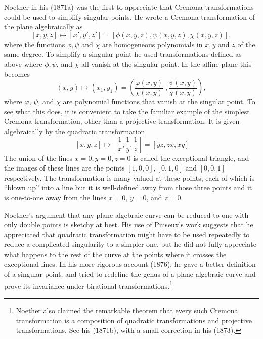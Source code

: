 Noether in his (1871a) was the first to appreciate that Cremona transformations could be used to simplify singular points.  He wrote a Cremona transformation of the plane algebraically as 
\[[x, y, z] \mapsto [x', y', z'] = [\phi (x, y, z), \psi (x, y, z),  \chi (x, y, z)], \]
where the functions $\phi, \psi$ and $\chi$ are homogeneous polynomials in $x, y$ and $z$ of the same degree. To simplify a singular point he used
transformations defined as above where $\phi, \psi$, and $\chi$ all vanish at the singular point.  In the affine plane this becomes
\[(x , y) \mapsto (x_1 , y_1) = \left(\frac{\varphi (x, y)}{\chi (x, y)}\;,  \frac{\psi (x, y)}{\chi (x, y)} \right),\]
where $\varphi$, $\psi$, and $\chi$ are polynomial functions that vanish at the singular point.  To see what this does, it is convenient to take the familiar example of 
the simplest  Cremona transformation, other than a projective transformation. It  is given algebraically by  the quadratic transformation 
\begin{equation}~\label{eq:qt1}
[x, y, z] \mapsto \left[\frac{1}{x}, \frac{1}{y}, \frac{1}{z}\right] = [yz, zx, xy]\end{equation}
The union of the lines $x=0,y=0,z=0$ is called the exceptional triangle, and the images of these lines are the points $[1, 0, 0], [0, 1, 0]$ and $[0, 0, 1]$ respectively.
The transformation is many-valued at these points, each of which is ``blown up'' into a line  but it is well-defined away from those three points and it is  one-to-one away from  the lines $x=0$, $y=0$, and $z = 0.$ 


Noether's argument that any plane algebraic curve can be reduced to one with only double points is sketchy at best. His use of Puiseux's work suggests that he appreciated that quadratic transformation might have to be used repeatedly to reduce a complicated singularity to a simpler one, but he did not  fully appreciate what happens to the rest of the curve at the points where it crosses the exceptional lines. In his more rigorous account  (1876),  he gave a better definition of a singular point, and tried to redefine the genus of a plane algebraic curve and prove its  invariance  under birational  transformations.\footnote{Noether also claimed  the remarkable theorem that every such Cremona transformation is a composition of quadratic transformations and projective transformations. See his (1871b), with a small correction in his (1873).} 


